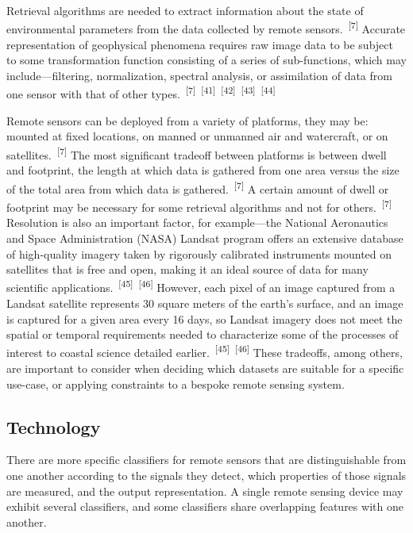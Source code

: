 \documentclass{article}
\begin{document}
\par{Retrieval algorithms are needed to extract information about the state of environmental parameters from the data collected by remote sensors.~\textsuperscript{[7]} Accurate representation of geophysical phenomena requires raw image data to be subject to some transformation function consisting of a series of sub-functions, which may include---filtering, normalization, spectral analysis, or assimilation of data from one sensor with that of other types.~\textsuperscript{[7]}~\textsuperscript{[41]}~\textsuperscript{[42]}~\textsuperscript{[43]}~\textsuperscript{[44]}}

\par{Remote sensors can be deployed from a variety of platforms, they may be: mounted at fixed locations, on manned or unmanned air and watercraft, or on satellites.~\textsuperscript{[7]} The most significant tradeoff between platforms is between dwell and footprint, the length at which data is gathered from one area versus the size of the total area from which data is gathered.~\textsuperscript{[7]} A certain amount of dwell or footprint may be necessary for some retrieval algorithms and not for others.~\textsuperscript{[7]} Resolution is also an important factor, for example---the National Aeronautics and Space Administration (NASA) Landsat program offers an extensive database of high-quality imagery taken by rigorously calibrated instruments mounted on satellites that is free and open, making it an ideal source of data for many scientific applications.~\textsuperscript{[45]}~\textsuperscript{[46]} However, each pixel of an image captured from a Landsat satellite represents 30 square meters of the earth's surface, and an image is captured for a given area every 16 days, so Landsat imagery does not meet the spatial or temporal requirements needed to characterize some of the processes of interest to coastal science detailed earlier.~\textsuperscript{[45]}~\textsuperscript{[46]} These tradeoffs, among others, are important to consider when deciding which datasets are suitable for a specific use-case, or applying constraints to a bespoke remote sensing system.}

\subsection{Technology}

\par{There are more specific classifiers for remote sensors that are distinguishable from one another according to the signals they detect, which properties of those signals are measured, and the output representation. A single remote sensing device may exhibit several classifiers, and some classifiers share overlapping features with one another.}
\end{document}
